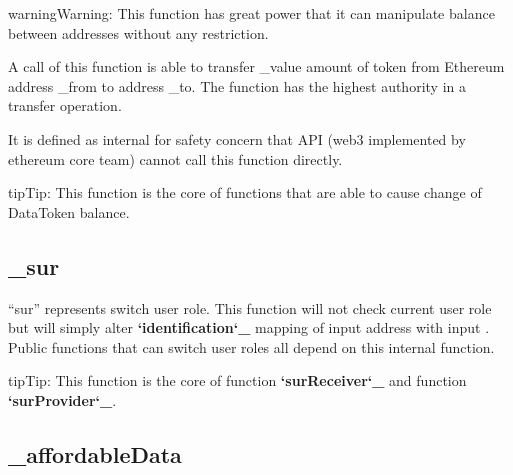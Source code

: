 \documentclass[letterpaper,10pt,english]{sphinxmanual}
\begin{document}
\begin{sphinxadmonition}{warning}{Warning:}
This function has great power that it can manipulate balance between addresses without any restriction.
\end{sphinxadmonition}

A call of this function is able to transfer \_value amount of token
from Ethereum address \_from to address \_to. The function has the
highest authority in a transfer operation.

It is defined as internal
for safety concern that API (web3 implemented by ethereum core team)
cannot call this function directly.

\begin{sphinxadmonition}{tip}{Tip:}
This function is the core of functions that are able to cause change of DataToken balance.
\end{sphinxadmonition}


\subsection{\_sur}
\label{\detokenize{InternalFunctions:sur}}
%
\begin{sphinxVerbatim}[commandchars=\\\{\}]
      
\end{sphinxVerbatim}

“sur” represents switch user role. This function will not check current user role but will
simply alter {\color{red}\bfseries{}{}`identification{}`\_} mapping of input  address with input .
Public functions that can switch user roles all depend on this internal function.

\begin{sphinxadmonition}{tip}{Tip:}
This function is the core of function {\color{red}\bfseries{}{}`surReceiver{}`\_} and function {\color{red}\bfseries{}{}`surProvider{}`\_}.
\end{sphinxadmonition}


\subsection{\_affordableData}
\label{\detokenize{InternalFunctions:affordabledata}}
%
\begin{sphinxVerbatim}[commandchars=\\\{\}]
     
\end{sphinxVerbatim}
\end{document}
